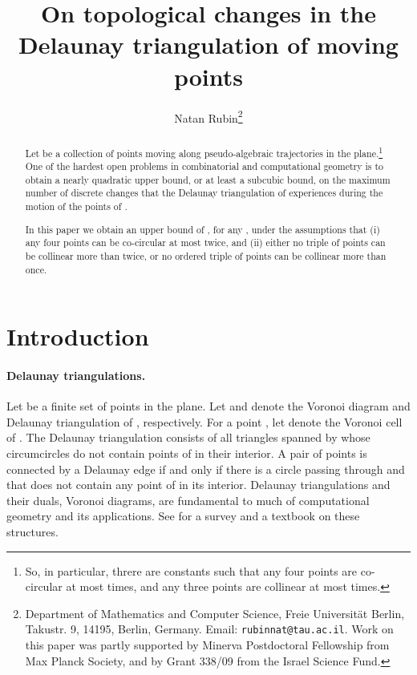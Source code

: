 \documentclass[letter,11pt]{article}
\begin{document}
\title{On topological changes in the Delaunay triangulation of moving points}
\author{Natan Rubin\thanks{Department of Mathematics and Computer Science, Freie Universit\"{a}t Berlin, Takustr. 9, 14195, Berlin, Germany.
Email: {\tt rubinnat@tau.ac.il}. Work on this paper was partly supported by Minerva Postdoctoral Fellowship from Max Planck Society, and by Grant 338/09 from the Israel Science Fund.}}


\maketitle
\begin{abstract}
Let  be a collection of  points moving along pseudo-algebraic trajectories in the plane.\footnote{So, in particular, threre are constants  such that any four points are co-circular at most  times, and any three points are collinear at most  times.} 
One of the hardest open problems in combinatorial and computational geometry is to obtain a nearly quadratic upper bound, or at least a subcubic bound, on the maximum number of discrete changes that the Delaunay triangulation  of  experiences during the motion of the points of .

In this paper we obtain an upper bound of , for any , under the assumptions that (i) any four points can be co-circular at most twice, and (ii) either no triple of points can be collinear more than twice, or no ordered triple of points can be collinear more than once.
\end{abstract}

\section{Introduction}\label{Sec:Intro}
\paragraph{Delaunay triangulations.} 
Let  be a finite set of points in the plane. 
Let  and  denote the Voronoi diagram and Delaunay
triangulation of , respectively. For a point , let
 denote the Voronoi cell of . 
The Delaunay triangulation  consists of all 
triangles spanned by  whose circumcircles do not contain points of  in their
interior. A pair of points  is connected by a Delaunay edge if and only if
there is a circle passing through 
and  that does not contain any point of  in its interior.
Delaunay triangulations and  their duals, Voronoi diagrams, are fundamental to much 
of computational geometry and its applications. 
See \cite{AK,Ed2} for a survey and a
textbook on these structures.
\end{document}

